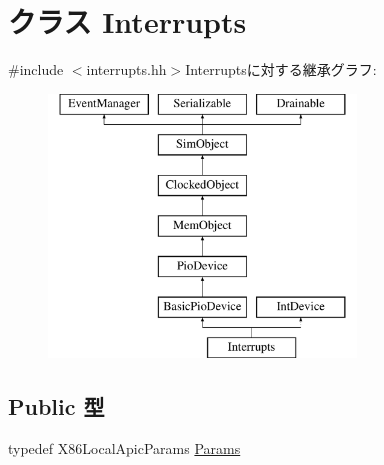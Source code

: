\hypertarget{classX86ISA_1_1Interrupts}{
\section{クラス Interrupts}
\label{classX86ISA_1_1Interrupts}
}


{\ttfamily \#include $<$interrupts.hh$>$}Interruptsに対する継承グラフ:\begin{figure}[H]
\begin{center}
\leavevmode
\includegraphics[height=7cm]{classX86ISA_1_1Interrupts}
\end{center}
\end{figure}
\subsection*{Public 型}
\begin{DoxyCompactItemize}
\item 
typedef X86LocalApicParams \hyperlink{classX86ISA_1_1Interrupts_a3c48a671abef695247afdd48259ac20a}{Params}
\end{DoxyCompactItemize}
